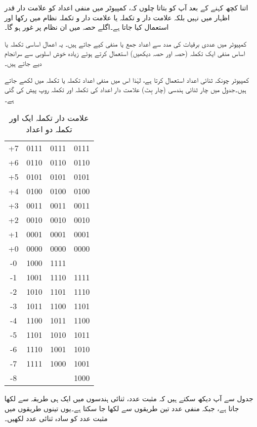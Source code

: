 اتنا کچھ کہنے کے بعد آپ کو بتاتا چلوں کہ،  کمپیوٹر میں منفی  اعداد کو  علامت دار قدر اظہار  میں نہیں بلکہ علامت دار و تکملہ   یا علامت دار و تکملہ  نظام  میں رکھا اور استعمال کیا جاتا ہے۔اگلے حصہ میں ان  نظام  پر غور ہو گا۔

کمپیوٹر میں عددی  برقیات  کی  مدد سے اعداد جمع یا منفی کیے جاتے ہیں۔  یہ اعمال اساسی تکملہ یا اساس منفی ایک تکملہ (حصہ  اور  حصہ  دیکھیں)  استعمال کرتے ہوئے زیادہ خوش اسلوبی سے سرانجام دیے جاتے ہیں۔

 کمپیوٹر  چونکہ  ثنائی اعداد استعمال   کرتا ہے، لہٰذا اس میں   منفی اعداد    تکملہ  یا تکملہ    میں لکھے جاتے ہیں۔جدول   میں    چار  ثنائی ہندسی (چار بِٹ)   علامت دار  اعداد کی تکملہ  اور تکملہ 
 روپ پیش کی گئی ہے۔
\begin{table}
\caption{علامت دار تکملہ ایک اور تکملہ دو اعداد}
\label{جدول_حساب_علامت_دار_تکملہ_ایک_دو}
\centering
\begin{tabular}{CCCC}
\toprule
{} &  &  & \\
\midrule
+7&0111&0111&0111\\
+6&0110&0110&0110\\
+5&0101&0101&0101\\
+4&0100&0100&0100\\[0.5em]
+3&0011&0011&0011\\
+2&0010&0010&0010\\
+1&0001&0001&0001\\
+0&0000&0000&0000\\[0.5em]
-0&1000&1111&\\
-1&1001&1110&1111\\
-2&1010&1101&1110\\
-3&1011&1100&1101\\[0.5em]
-4&1100&1011&1100\\
-5&1101&1010&1011\\
-6&1110&1001&1010\\
-7&1111&1000&1001\\
-8&&&1000\\
\bottomrule
\end{tabular}
\end{table}

جدول  سے آپ دیکھ سکتے ہیں کہ مثبت عدد،   ثنائی ہندسوں میں ایک ہی طریقہ سے لکھا جاتا ہے،  جبکہ منفی عدد  تین طریقوں سے لکھا   جا سکتا ہے۔یوں  تینوں  طریقوں میں مثبت عدد کو سادہ  ثنائی عدد لکھیں۔

